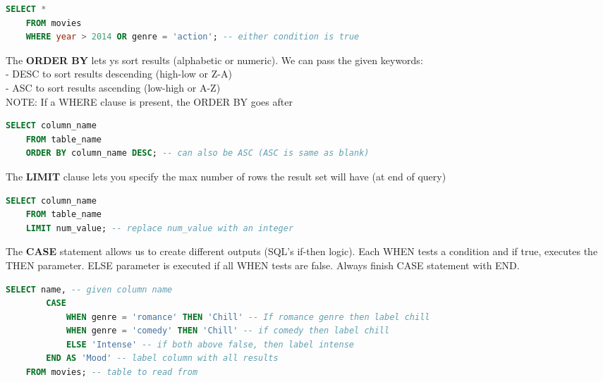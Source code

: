 \documentclass[11pt, a4paper]{article}
\begin{document}
\begin{spacing}{1.1}
\begin{lstlisting}[language=SQL]
	SELECT *
	FROM movies
	WHERE year > 2014 OR genre = 'action'; -- either condition is true \end{lstlisting}  \vspace*{1mm}
	\noindent The \textbf{ORDER BY} lets ys sort results (alphabetic or numeric). We can pass the given keywords: \\
	\hspace*{3mm} - DESC to sort results descending (high-low or Z-A) \\
	\hspace*{3mm} - ASC to sort results ascending (low-high or A-Z) \\
	NOTE: If a WHERE clause is present, the ORDER BY goes after
	\begin{lstlisting}[language=SQL]
	SELECT column_name
	FROM table_name
	ORDER BY column_name DESC; -- can also be ASC (ASC is same as blank) \end{lstlisting} \vspace*{1mm}
	The \textbf{LIMIT} clause lets you specify the max number of rows the result set will have (at end of query)
	\begin{lstlisting}[language=SQL]
	SELECT column_name
	FROM table_name
	LIMIT num_value; -- replace num_value with an integer \end{lstlisting} \vspace*{1mm}
	The \textbf{CASE} statement allows us to create different outputs (SQL's if-then logic). Each WHEN tests a condition and if true, executes the THEN parameter. ELSE parameter is executed if all WHEN tests are false. Always finish CASE statement with END.
	\begin{lstlisting}[language=SQL]
	SELECT name, -- given column name
		CASE
			WHEN genre = 'romance' THEN 'Chill' -- If romance genre then label chill
			WHEN genre = 'comedy' THEN 'Chill' -- if comedy then label chill
			ELSE 'Intense' -- if both above false, then label intense
		END AS 'Mood' -- label column with all results
	FROM movies; -- table to read from \end{lstlisting} \vspace*{5mm}
		

\end{spacing}
\end{document}
